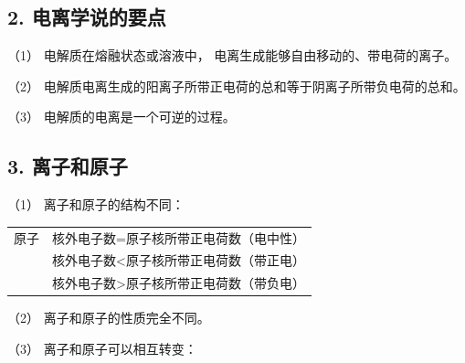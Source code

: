 \subsection{2. 电离学说的要点}

（1） 电解质在熔融状态或溶液中， 电离生成能够自由移动的、带电荷的离子。

（2） 电解质电离生成的阳离子所带正电荷的总和等于阴离子所带负电荷的总和。

（3） 电解质的电离是一个可逆的过程。

\subsection{3. 离子和原子}

（1） 离子和原子的结构不同：

{\def\LTcaptype{none} %
\begin{longtable}[]{@{}
  >{\raggedright\arraybackslash}p{}
  >{\raggedright\arraybackslash}p{}@{}}
\toprule\noalign{}
\endhead
\bottomrule\noalign{}
\endlastfoot
原子 & 核外电子数=原子核所带正电荷数（电中性） \\
\multirow{2}{*}{离子} &
核外电子数\textless 原子核所带正电荷数（带正电） \\
& 核外电子数\textgreater 原子核所带正电荷数（带负电） \\
\end{longtable}
}

（2） 离子和原子的性质完全不同。

（3） 离子和原子可以相互转变：

